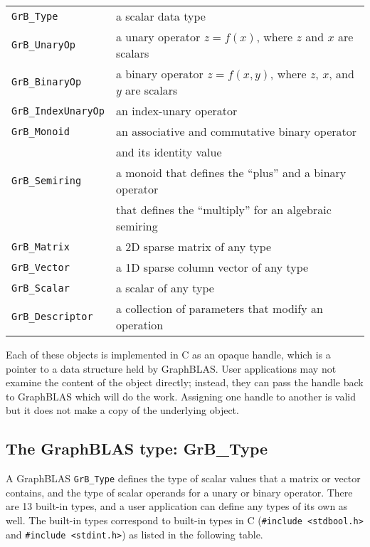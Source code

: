 \documentclass[12pt]{article}
\begin{document}
\vspace{0.1in}
\noindent
{\small
\begin{tabular}{ll}
\hline
\verb'GrB_Type'      & a scalar data type \\
\verb'GrB_UnaryOp'   & a unary operator $z=f(x)$, where $z$ and $x$ are scalars\\
\verb'GrB_BinaryOp'  & a binary operator $z=f(x,y)$, where $z$, $x$, and $y$ are scalars\\
\verb'GrB_IndexUnaryOp'  & an index-unary operator \\
\verb'GrB_Monoid'    & an associative and commutative binary operator  \\
                     & and its identity value \\
\verb'GrB_Semiring'  & a monoid that defines the ``plus'' and a binary operator\\
                     & that defines the ``multiply'' for an algebraic semiring \\
\verb'GrB_Matrix'    & a 2D sparse matrix of any type \\
\verb'GrB_Vector'    & a 1D sparse column vector of any type \\
\verb'GrB_Scalar'    & a scalar of any type \\
\verb'GrB_Descriptor'& a collection of parameters that modify an operation \\
\hline
\end{tabular}
}
\vspace{0.1in}

Each of these objects is implemented in C as an opaque handle, which is a
pointer to a data structure held by GraphBLAS.  User applications may not
examine the content of the object directly; instead, they can pass the handle
back to GraphBLAS which will do the work.  Assigning one handle to another
is valid but it does not make a copy of the underlying object.

\newpage
\subsection{The GraphBLAS type: {\sf GrB\_Type}} %
\label{type}

A GraphBLAS \verb'GrB_Type' defines the type of scalar values that a matrix or
vector contains, and the type of scalar operands for a unary or binary
operator.  There are 13 built-in types, and a user application can define
any types of its own as well.  The built-in types correspond to built-in types
in C (\verb'#include <stdbool.h>' and \verb'#include <stdint.h>')
as listed in the following table.
\end{document}
